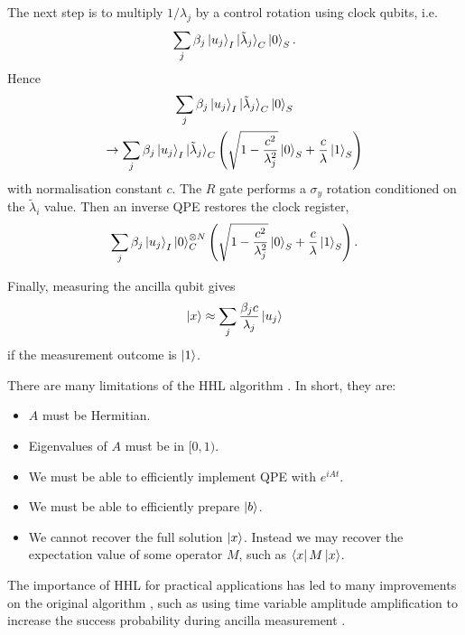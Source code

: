 \documentclass[10pt]{iopart}
\begin{document}
The next step is to multiply $1/\lambda_j$ by a control rotation using clock qubits, i.e. 
\begin{equation}
\sum_j \beta_j \ket{u_j}_I \ket{\tilde{\lambda}_j}_C \ket{0}_S.
\end{equation}
Hence 
\begin{gather}
\sum_j \beta_j \ket{u_j}_I \ket{\tilde{\lambda}_j}_C \ket{0}_S \nonumber\\
\to
\sum_j \beta_j \ket{u_j}_I \ket{\tilde{\lambda}_j}_C 
\left( 
\sqrt{1-\frac{c^2}{\lambda_j^2}}\ket{0}_S + \frac{c}{\lambda}\ket{1}_S
\right)
\end{gather}
with normalisation constant $c$. The $R$ gate performs a $\sigma_y$ rotation conditioned on the $\tilde{\lambda}_i$ value. Then an inverse QPE restores the clock register,
\begin{equation}
\sum_j \beta_j \ket{u_j}_I \ket{0}^{\otimes N}_C 
\left( 
\sqrt{1-\frac{c^2}{\lambda_j^2}}\ket{0}_S + \frac{c}{\lambda}\ket{1}_S
\right).
\end{equation}

Finally, measuring the ancilla qubit gives
\begin{equation}
\ket{x} \approx
\sum_j \frac{\beta_j c}{\lambda_j} \ket{u_j} 
\end{equation}
if the measurement outcome is $\ket{1}$.

There are many limitations of the HHL algorithm \cite{Aaronson2015,Dervovic2018}. In short, they are:
\begin{itemize}
\item $A$ must be Hermitian.
\item Eigenvalues of $A$ must be in $[0,1)$.
\item We must be able to efficiently implement QPE with $e^{iAt}$.
\item We must be able to efficiently prepare $\ket{b}$.
\item We cannot recover the full solution $\ket{x}$. Instead we may recover the expectation value of some operator $M$, such as $\bra{x}M\ket{x}$.
\end{itemize}

The importance of HHL for practical applications has led to many improvements on the original algorithm \cite{Childs2017}, such as using time variable amplitude amplification to increase the success probability during ancilla measurement \cite{Ambainis2012}. 
\end{document}
